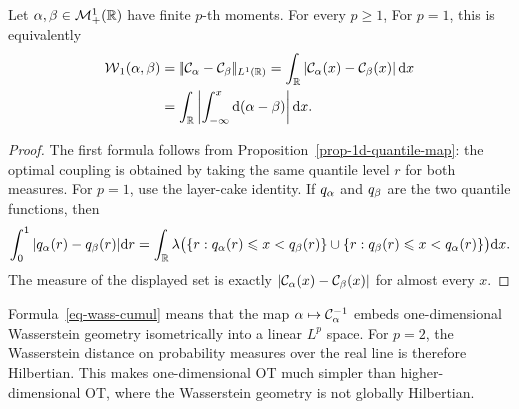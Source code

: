 \begin{prop}\label{prop-wass-quantile-1d}
	Let $\alpha,\beta\in\mathcal{M}_+^1(\mathbb{R})$ have finite $p$-th moments. For every $p\geq1$,
	For $p=1$, this is equivalently
	\begin{align}\label{eq-w1-1d}
		\operatorname{\mathcal{W}}_1(\alpha,\beta)
		&=
		|\!| \mathcal{C}_{\alpha}-\mathcal{C}_{\beta} |\!|_{L^1(\mathbb{R})}
		=
		\int_{\mathbb{R}} \left\lvert\mathcal{C}_{\alpha}(x)-\mathcal{C}_{\beta}(x)\right\rvert\mathrm{d} x \\
		&=
		\int_{\mathbb{R}} \left\lvert\int_{-\infty}^x\mathrm{d}(\alpha-\beta)\right\rvert\mathrm{d} x.
	\end{align}
\end{prop}
\begin{proof}
	The first formula follows from Proposition~\ref{prop-1d-quantile-map}: the optimal coupling is obtained by taking the same quantile level $r$ for both measures. For $p=1$, use the layer-cake identity. If $q_\alpha$ and $q_\beta$ are the two quantile functions, then
	\[
		\int_0^1 |q_\alpha(r)-q_\beta(r)|\mathrm{d} r
		=
		\int_{\mathbb{R}}
		\lambda\bigl(\{r:q_\alpha(r)\leqslant x<q_\beta(r)\}\cup\{r:q_\beta(r)\leqslant x<q_\alpha(r)\}\bigr)\mathrm{d} x.
	\]
	The measure of the displayed set is exactly $|\mathcal{C}_{\alpha}(x)-\mathcal{C}_{\beta}(x)|$ for almost every $x$.
\end{proof}

Formula~\eqref{eq-wass-cumul} means that the map $\alpha\mapsto\mathcal{C}_{\alpha}^{-1}$ embeds one-dimensional Wasserstein geometry isometrically into a linear $L^p$ space. For $p=2$, the Wasserstein distance on probability measures over the real line is therefore Hilbertian. This makes one-dimensional OT much simpler than higher-dimensional OT, where the Wasserstein geometry is not globally Hilbertian.


